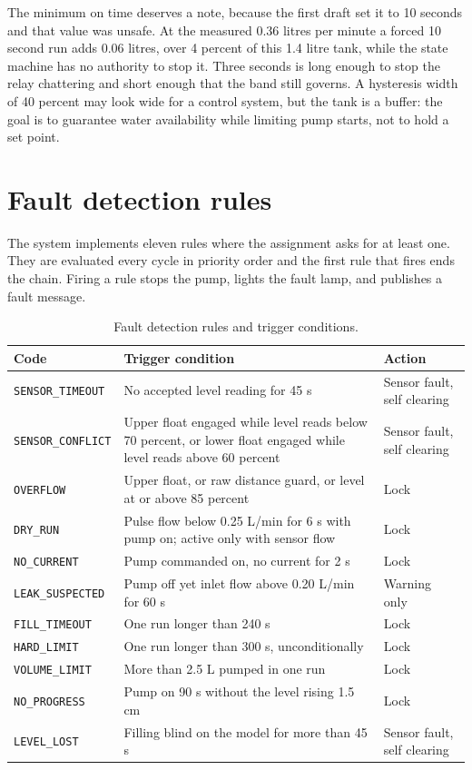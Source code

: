 The minimum on time deserves a note, because the first draft set it to 10 seconds and that value was unsafe. At the measured 0.36 litres per minute a forced 10 second run adds 0.06 litres, over 4 percent of this 1.4 litre tank, while the state machine has no authority to stop it. Three seconds is long enough to stop the relay chattering and short enough that the band still governs. A hysteresis width of 40 percent may look wide for a control system, but the tank is a buffer: the goal is to guarantee water availability while limiting pump starts, not to hold a set point.

\section{Fault detection rules}

The system implements eleven rules where the assignment asks for at least one. They are evaluated every cycle in priority order and the first rule that fires ends the chain. Firing a rule stops the pump, lights the fault lamp, and publishes a fault message.

\begin{table}[H]
\caption{Fault detection rules and trigger conditions.}
\label{tab:luatloi}
\centering
\renewcommand{\arraystretch}{1.08}
\begin{tabular}{|p{3.2cm}|p{6.9cm}|p{2.7cm}|}
\hline
\rowcolor[HTML]{B7E1F0}
\textbf{Code} & \textbf{Trigger condition} & \textbf{Action} \\
\hline
\texttt{SENSOR\_TIMEOUT} & No accepted level reading for 45 s & Sensor fault, self clearing \\
\hline
\texttt{SENSOR\_CONFLICT} & Upper float engaged while level reads below 70 percent, or lower float engaged while level reads above 60 percent & Sensor fault, self clearing \\
\hline
\texttt{OVERFLOW} & Upper float, or raw distance guard, or level at or above 85 percent & Lock \\
\hline
\texttt{DRY\_RUN} & Pulse flow below 0.25 L/min for 6 s with pump on; active only with sensor flow & Lock \\
\hline
\texttt{NO\_CURRENT} & Pump commanded on, no current for 2 s & Lock \\
\hline
\texttt{LEAK\_SUSPECTED} & Pump off yet inlet flow above 0.20 L/min for 60 s & Warning only \\
\hline
\texttt{FILL\_TIMEOUT} & One run longer than 240 s & Lock \\
\hline
\texttt{HARD\_LIMIT} & One run longer than 300 s, unconditionally & Lock \\
\hline
\texttt{VOLUME\_LIMIT} & More than 2.5 L pumped in one run & Lock \\
\hline
\texttt{NO\_PROGRESS} & Pump on 90 s without the level rising 1.5 cm & Lock \\
\hline
\texttt{LEVEL\_LOST} & Filling blind on the model for more than 45 s & Sensor fault, self clearing \\
\hline
\end{tabular}
\end{table}

